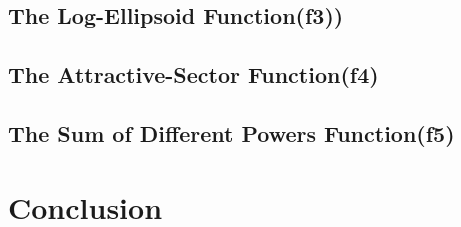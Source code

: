 \documentclass[12pt]{article}
\begin{document}
\subsection{The Log-Ellipsoid Function(f3))}

\subsection{The Attractive-Sector Function(f4)}

\subsection{The Sum of Different Powers Function(f5)}



\section{Conclusion}

\end{document}

